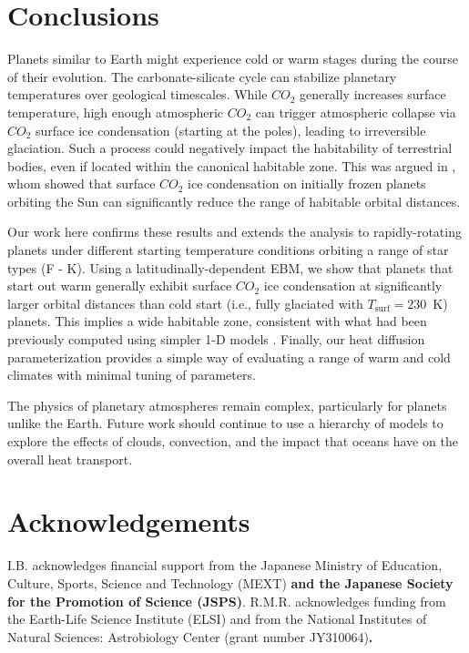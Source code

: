 \documentclass[fleqn,usenatbib]{mnras}
\providecommand{\DIFadd}[1]{{\bf #1}} %
\providecommand{\DIFdel}[1]{} %
\providecommand{\DIFaddbegin}{} %
\providecommand{\DIFaddend}{} %
\providecommand{\DIFdelbegin}{} %
\providecommand{\DIFdelend}{} %
\newcommand{\DIFscaledelfig}{0.5}
\newlength{\DIFdelgraphicswidth} %
\newlength{\DIFdelgraphicsheight} %
\newcommand{\DIFaddincludegraphics}[2][]{{\color{blue}\fbox{\DIFOincludegraphics[#1]{#2}}}} %
\newcommand{\DIFdelincludegraphics}[2][]{%
\sbox{\DIFdelgraphicsbox}{\DIFOincludegraphics[#1]{#2}}%
\settoboxwidth{\DIFdelgraphicswidth}{\DIFdelgraphicsbox} %
\settoboxtotalheight{\DIFdelgraphicsheight}{\DIFdelgraphicsbox} %
\scalebox{\DIFscaledelfig}{%
\parbox[b]{\DIFdelgraphicswidth}{\usebox{\DIFdelgraphicsbox}\\[-\baselineskip] \rule{\DIFdelgraphicswidth}{0em}}\llap{\resizebox{\DIFdelgraphicswidth}{\DIFdelgraphicsheight}{%
\setlength{\unitlength}{\DIFdelgraphicswidth}%
\begin{picture}(1,1)%
\thicklines\linethickness{2pt} %
{\color[rgb]{1,0,0}\put(0,0){\framebox(1,1){}}}%
{\color[rgb]{1,0,0}\put(0,0){\line( 1,1){1}}}%
{\color[rgb]{1,0,0}\put(0,1){\line(1,-1){1}}}%
\end{picture}%
}\hspace*{3pt}}} %
} %
\DeclareRobustCommand{\DIFaddbegin}{\DIFOaddbegin \let\includegraphics\DIFaddincludegraphics} %
\DeclareRobustCommand{\DIFaddend}{\DIFOaddend \let\includegraphics\DIFOincludegraphics} %
\DeclareRobustCommand{\DIFdelbegin}{\DIFOdelbegin \let\includegraphics\DIFdelincludegraphics} %
\DeclareRobustCommand{\DIFdelend}{\DIFOaddend \let\includegraphics\DIFOincludegraphics} %
\begin{document}
\DIFaddend \section{Conclusions}
Planets similar to Earth might experience cold or warm stages during the course of their evolution. The carbonate-silicate cycle can stabilize planetary temperatures over geological timescales. While  $CO_{\mathrm{2}}$ generally increases surface temperature, high enough atmospheric $CO_{\mathrm{2}}$ can trigger atmospheric collapse via $CO_{\mathrm{2}}$ surface ice condensation (starting at the poles), leading to irreversible glaciation. Such a process could negatively impact the habitability of terrestrial bodies, even if located within the canonical habitable zone. This was argued in \citet{Turbet2017}, whom showed that surface $CO_{\mathrm{2}}$ ice condensation on initially frozen planets orbiting the Sun can significantly reduce the range of habitable orbital distances. 

Our work here confirms these results and extends the analysis to rapidly-rotating planets under different starting temperature conditions orbiting a range of star types (F - K). Using a latitudinally-dependent EBM, we show that planets that start out warm generally exhibit surface $CO_{\mathrm{2}}$ ice condensation at significantly larger orbital distances than cold start (i.e., fully glaciated with $T_{\mathrm{surf}}=230$~K) planets. This implies a wide habitable zone, consistent with what had been previously computed using simpler 1-D models \citep{kasting1993,KumarKopparapu2013,Ramirez2018}. \DIFdelbegin \DIFdel{Although our model predicts that this zone remains similarly wide across obliquities, we find that inefficient poleward heat transport leads to more surface  $CO_{\mathrm{2}}$ ice production at lower ($0^{\circ}$) obliquity. }\DIFdelend Finally, our heat diffusion parameterization provides a simple way of evaluating a range of warm and cold climates with minimal tuning of parameters. 

The physics of planetary atmospheres remain complex, particularly for planets unlike the Earth. Future work should continue to use a hierarchy of models to explore the effects of clouds, convection, and the impact that oceans have on the overall heat transport. 

\section*{Acknowledgements}
I.B. acknowledges financial support from the Japanese Ministry of Education, Culture, Sports, Science and Technology (MEXT) \DIFaddbegin \DIFadd{and the Japanese Society for the Promotion of Science (JSPS)}\DIFaddend .
R.M.R. acknowledges funding from the Earth-Life Science Institute (ELSI) and from the National Institutes of Natural Sciences: Astrobiology Center (grant number JY310064)\DIFaddbegin \DIFadd{.
}
\end{document}
